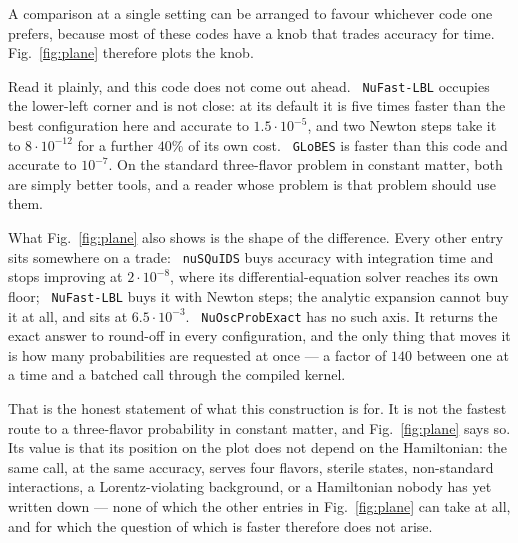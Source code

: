 \documentclass[final,5p,times,twocolumn]{elsarticle}
\newcommand{\fig}{Fig.}
\newcommand{\figu}[1]{\fig~\ref{fig:#1}}
\providecommand{\DIFaddtex}[1]{{\protect\color{blue} \sf #1}} %
\providecommand{\DIFadd}[1]{\DIFaddtex{#1}} %
\begin{document}

\DIFadd{A comparison at a single setting can be arranged to favour whichever code one prefers, because most of these codes have a knob that trades accuracy for time.  \figu{plane} therefore plots the knob.
}

\DIFadd{Read it plainly, and this code does not come out ahead.  }{\tt \DIFadd{NuFast-LBL}} \DIFadd{occupies the lower-left corner and is not close: at its default it is five times faster than the best configuration here and accurate to $1.5 \cdot 10^{-5}$, and two Newton steps take it to $8 \cdot 10^{-12}$ for a further $40\%$ of its own cost.  }{\tt \DIFadd{GLoBES}} \DIFadd{is faster than this code and accurate to $10^{-7}$.  On the standard three-flavor problem in constant matter, both are simply better tools, and a reader whose problem is that problem should use them.
}

\DIFadd{What \figu{plane} also shows is the shape of the difference.  Every other entry sits somewhere on a trade: }{\tt \DIFadd{nuSQuIDS}} \DIFadd{buys accuracy with integration time and stops improving at $2 \cdot 10^{-8}$, where its differential-equation solver reaches its own floor; }{\tt \DIFadd{NuFast-LBL}} \DIFadd{buys it with Newton steps; the analytic expansion cannot buy it at all, and sits at $6.5 \cdot 10^{-3}$.  }{\tt \DIFadd{NuOscProbExact}} \DIFadd{has no such axis.  It returns the exact answer to round-off in every configuration, and the only thing that moves it is how many probabilities are requested at once --- a factor of $140$ between one at a time and a batched call through the compiled kernel.
}

\DIFadd{That is the honest statement of what this construction is for.  It is not the fastest route to a three-flavor probability in constant matter, and \figu{plane} says so.  Its value is that its position on the plot does not depend on the Hamiltonian: the same call, at the same accuracy, serves four flavors, sterile states, non-standard interactions, a Lorentz-violating background, or a Hamiltonian nobody has yet written down --- none of which the other entries in \figu{plane} can take at all, and for which the question of which is faster therefore does not arise.
}
\end{document}
